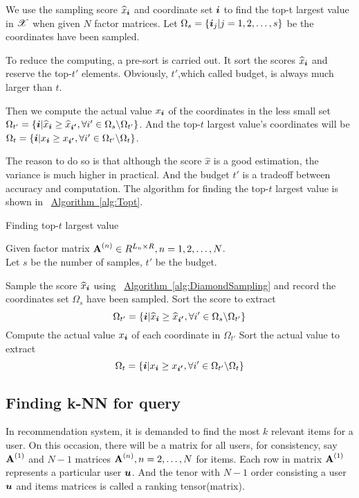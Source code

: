 \documentclass{article}
\newcommand{\T}[1]{\boldsymbol{\mathscr{\MakeUppercase{#1}}}}%
\newcommand{\V}[1]{{\bm{{\MakeLowercase{#1}}}}}%
\newcommand{\M}[1]{{\bm{\mathbf{\MakeUppercase{#1}}}}}%
\newcommand{\Alg}[1]{\hyperref[alg:#1]{Algorithm~\ref*{alg:#1}}}
\begin{document}
We use the sampling score $\widehat{x}_{\V{i}}$ and coordinate set $\V{i}$ to find the top-t largest value in $\T{X}$ when given $N$ factor matrices. Let $\Omega_s = \{\V{i}_j|j = 1,2,\ldots,s\}$ be the coordinates have been sampled.

To reduce the computing, a pre-sort is carried out. It sort the scores $\widehat{x}_{\V{i}}$ and reserve the top-$t'$ elements. Obviously, $t'$,which called budget, is always much larger than $t$.

Then we compute the actual value $x_{\V{i}}$ of the coordinates in the less small set $\Omega_{t'} = \{\V{i}|\widehat{x}_{\V{i}}\geq \widehat{x}_{\V{i'}},\forall i'\in \Omega_{s} \backslash \Omega_{t'}\}$. And the top-$t$ largest value's coordinates will be $\Omega_{t}=\{\V{i}|x_{\V{i}}\geq x_{\V{i'}},\forall i' \in \Omega_{t'} \backslash \Omega_{t} \}$.

The reason to do so is that although the score $\widehat{x}$ is a good estimation, the variance is much higher in practical. And the budget $t'$ is a tradeoff between accuracy and computation. The algorithm for finding the top-$t$ largest value is shown in ~\Alg{Topt}.
\begin{algorithm}[t]
    \caption{Finding top-$t$ largest value}
    \label{alg:Topt}
    Given factor matrix $\M{A}^{(n)}\in R^{L_n\times R}, n = 1,2,\ldots,N$.\\
    Let $s$ be the number of samples, $t'$ be the budget.
    \begin{algorithmic}[1]
    \State Sample the score $\widehat{x}_\V{i}$ using ~\Alg{DiamondSampling} and record the coordinates set $\Omega_s$ have been sampled.
    \State Sort the score to extract
    \[
        \Omega_{t'} = \{\V{i}|\widehat{x}_{\V{i}}\geq \widehat{x}_{\V{i'}},\forall i'\in \Omega_{s} \backslash \Omega_{t'}\}
    \]
    \State Compute the actual value $x_{\V{i}}$ of each coordinate in $\Omega_{t'}$
    \State Sort the actual value to extract
    \[
        \Omega_{t}=\{\V{i}|x_{\V{i}}\geq x_{\V{i'}},\forall i' \in \Omega_{t'} \backslash \Omega_{t} \}
    \]
    \end{algorithmic}
\end{algorithm}

\subsection{Finding k-NN for query}

In recommendation system, it is demanded to find the most $k$ relevant items for a user. On this occasion, there will be a matrix for all users, for consistency, say $\M{A}^{(1)}$ and $N-1$ matrices $\M{A}^{(n)},n=2,\ldots,N$ for items. Each row in matrix $\M{A}^{(1)}$ represents a particular user $\V{u}$. And the tenor with $N-1$ order consisting a user $\V{u}$ and items matrices is called a ranking tensor(matrix).
\end{document}
